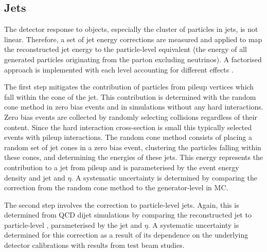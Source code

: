 

\subsection{Jets}

The detector response to objects, especially the cluster of particles in jets,
is not linear. Therefore, a set of jet energy corrections are measured and
applied to map the reconstructed jet energy to the particle-level equivalent
(the energy of all generated particles originating from the parton excluding
neutrinos). A factorised approach is implemented with each level accounting
for different effects \cite{Khachatryan:2016kdb}.

The first step mitigates the contribution of particles from pileup vertices
which fall within the cone of the jet. This contribution is determined with
the random cone method in zero bias events and in simulations without any hard
interactions. Zero bias events are collected by randomly selecting collisions
regardless of their content. Since the hard interaction cross-section is small
this typically selected events with pileup interactions. The random cone
method consists of placing a random set of jet cones in a zero bias event,
clustering the particles falling within these cones, and determining the
energies of these jets. This energy represents the contribution to a jet from
pileup and is parameterised by the event energy density and jet \pt and
$\eta$. A systematic uncertainty is determined by comparing the correction
from the random cone method to the generator-level in MC.

The second step involves the correction to particle-level jets. Again, this is
determined from QCD dijet simulations by comparing the reconstructed jet \pt
to particle-level \pt, parameterised by the jet \pt and $\eta$. A systematic
uncertainty is determined for this correction as a result of its dependence on
the underlying detector calibrations with results from test beam studies.

